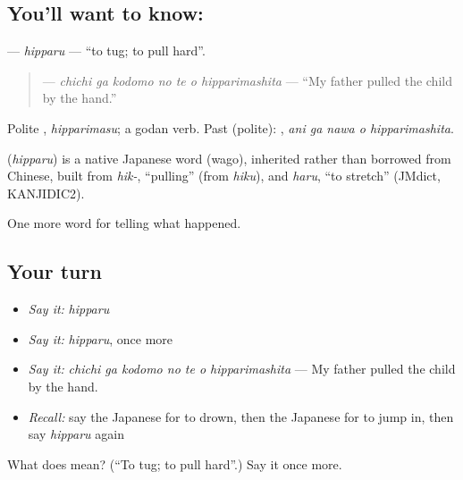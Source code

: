 \subsection*{You'll want to know: }
\textbf{} — \emph{hipparu} — \textquotedblleft{}to tug; to pull hard\textquotedblright{}.

\begin{quote}
\textbf{   } — \emph{chichi ga kodomo no te o hipparimashita} — \textquotedblleft{}My father pulled the child by the hand.\textquotedblright{}
\end{quote}

Polite \textbf{}, \emph{hipparimasu}; a godan verb. Past (polite): \textbf{  }, \emph{ani ga nawa o hipparimashita}.

\begin{cousinweb}
\textbf{} (\emph{hipparu}) is a native Japanese word (wago), inherited rather than borrowed from Chinese, built from \emph{hik-}, \textquotedblleft{}pulling\textquotedblright{} (from \emph{hiku}), and \emph{haru}, \textquotedblleft{}to stretch\textquotedblright{} (JMdict, KANJIDIC2).
\end{cousinweb}

\begin{grammarlens}[title={What you've built}]
One more word for telling what happened.
\end{grammarlens}

\subsection*{Your turn}
\begin{itemize}
\raggedright
  \item \emph{Say it:} \emph{hipparu}
  \item \emph{Say it:} \emph{hipparu}, once more
  \item \emph{Say it:} \emph{chichi ga kodomo no te o hipparimashita} — My father pulled the child by the hand.
  \item \emph{Recall:} say the Japanese for to drown, then the Japanese for to jump in, then say \emph{hipparu} again
\end{itemize}

\begin{tcolorbox}[breakable,colback=teal!4,colframe=teal!35!black,title={Before you move on}]
What does  mean? (\textquotedblleft{}To tug; to pull hard\textquotedblright{}.) Say it once more.
\end{tcolorbox}
